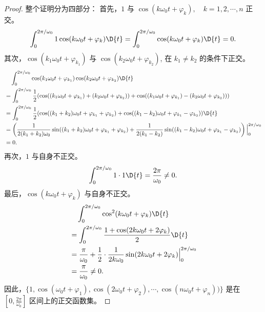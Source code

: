 \begin{proof}
    整个证明分为四部分：
    首先，$1$ 与 $\cos(k\omega_0t + \varphi_k), \quad k = 1, 2, \cdots, n$ 正交。
    \begin{align*}
        \int_{0}^{2\pi/\omega_0}1\cos(k\omega_0t + \varphi_k)\D{t}
        = \int_{0}^{2\pi/\omega_0}\cos(k\omega_0t + \varphi_k)\D{t}
        = 0.
    \end{align*}
    其次，$\cos(k_1\omega_0t + \varphi_{k_1})$ 与 $\cos(k_2\omega_0t + \varphi_{k_2})$, 在 $k_1 \ne k_2$ 的条件下正交。
    \begin{align*}
        & \quad \int_{0}^{2\pi/\omega_0}\cos(k_1\omega_0t + \varphi_{k_1})\cos(k_2\omega_0t + \varphi_{k_2})\D{t} \\
        & = \int_{0}^{2\pi/\omega_0}\frac{1}{2}(\cos((k_1\omega_0t + \varphi_{k_1}) + (k_2\omega_0t + \varphi_{k_2})) + \cos((k_1\omega_0t + \varphi_{k_1}) - (k_2\omega_0t + \varphi_{k_2}))) \\
        & = \int_{0}^{2\pi/\omega_0}\frac{1}{2}(\cos((k_1 + k_2)\omega_0t + \varphi_{k_1} + \varphi_{k_2}) + \cos((k_1 - k_2)\omega_0t + \varphi_{k_1} - \varphi_{k_2}))\D{t} \\
        & = \left(\frac{1}{2(k_1 + k_2)\omega_0}\sin((k_1 + k_2)\omega_0t + \varphi_{k_1} + \varphi_{k_2})
            + \frac{1}{2(k_1 - k_2)}\sin((k_1 - k_2)\omega_0t + \varphi_{k_1} - \varphi_{k_2})\right)\Big|_{0}^{2\pi/\omega_0} \\
        & = 0.
    \end{align*}
    再次，$1$ 与自身不正交。
    \begin{align*}
        \int_{0}^{2\pi/\omega_0}1\cdot 1\D{t}
        = \frac{2\pi}{\omega_0} \ne 0.
    \end{align*}
    最后，$\cos(k\omega_0t + \varphi_k)$ 与自身不正交。
    \begin{align*}
        & \quad \int_{0}^{2\pi/\omega_0}\cos^2(k\omega_0t + \varphi_k)\D{t} \\
        & = \int_{0}^{2\pi/\omega_0}\frac{1 + \cos(2k\omega_0t + 2\varphi_k)}{2}\D{t} \\
        & = \frac{\pi}{\omega_0} + \frac{1}{2}\cdot\frac{1}{2k\omega_0}\sin(2k\omega_0t + 2\varphi_k)\Big|_{0}^{2\pi/\omega_0} \\
        & = \frac{\pi}{\omega_0} \ne 0.
    \end{align*}
    因此，$\{1, \cos(\omega_0t + \varphi_1), \cos(2\omega_0t + \varphi_2), \cdots, \cos(n\omega_0 t + \varphi_n))\}$
    是在 $[0, \frac{2\pi}{\omega_0}]$ 区间上的正交函数集。
\end{proof}


